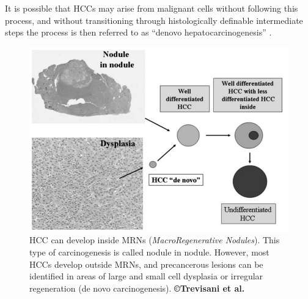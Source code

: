 \documentclass[]{article}
\begin{document}
It is possible that HCCs may arise from malignant cells without
following this process, and without transitioning through histologically
definable intermediate steps the process is then referred to as ``denovo
hepatocarcinogenesis'' \cite{Taguchi2002}.


\begin{figure}[th!]
\centering
\includegraphics[width=0.7\linewidth]{images/image3}
\caption{HCC can develop inside MRNs (\emph{MacroRegenerative Nodules}). This type of carcinogenesis is called nodule in nodule. However, most HCCs develop outside MRNs, and precancerous lesions can be identified in areas of large and small cell dysplasia or irregular regeneration (de novo carcinogenesis). \textbf{©Trevisani et al.} \cite{Trevisani2008a}}
\label{Trevisani2008_Fig2}
\end{figure}
\end{document}
